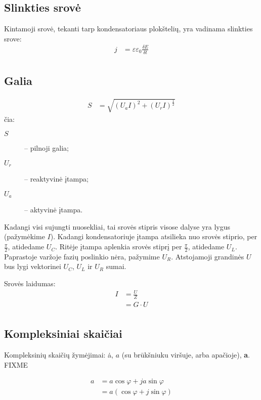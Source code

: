 \subsection{Slinkties srovė}

Kintamoji srovė, tekanti tarp kondensatoriaus plokštelių, yra vadinama
slinkties srove:
\begin{align*}
  j &= \varepsilon \varepsilon_{0} \frac{\delta E}{\delta t} \\
\end{align*}

\subsection{Galia}

\begin{align*}
  S
  &= \sqrt{\left( U_{a}I \right)^{2} +
    \left( U_{r}I \right)^{\frac{1}{2}}}
\end{align*}
čia:
\begin{description}
  \item[$S$] – pilnoji galia;
  \item[$U_{r}$] – reaktyvinė įtampa;
  \item[$U_{a}$] – aktyvinė įtampa.
\end{description}



Kadangi visi sujungti nuosekliai, tai srovės stipris visose dalyse
yra lygus (pažymėkime $I$). Kadangi kondensatoriuje įtampa atsilieka
nuo srovės stiprio, per $\frac{\pi}{2}$, atidedame $U_{C}$. Ritėje
įtampa aplenkia srovės stiprį per $\frac{\pi}{2}$, atidedame $U_{L}$.
Paprastoje varžoje fazių poslinkio nėra, pažymime $U_{R}$. Atstojamoji
grandinės $U$ bus lygi vektorinei $U_{C}$, $U_{L}$ ir $U_{R}$ sumai.

Srovės laidumas:
\begin{align*}
  I
  &= \frac{U}{Z} \\
  &= G \cdot U \\
\end{align*}

\subsection{Kompleksiniai skaičiai}

Kompleksinių skaičių žymėjimai:
\.{a}, $a$ (su brūkšniuku viršuje, arba apačioje), \textbf{a}. FIXME

\begin{align*}
  a
  &= a \cos \varphi + ja \sin \varphi \\
  &= a (\cos \varphi + j \sin \varphi) \\
\end{align*}

